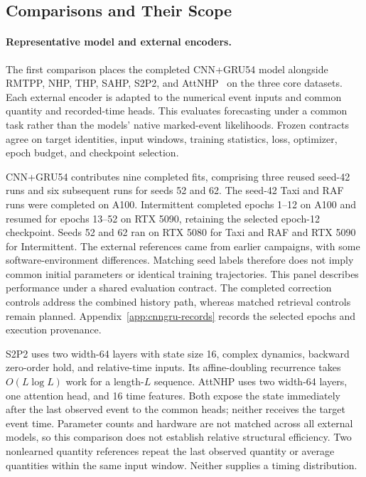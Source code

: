 \documentclass[runningheads]{llncs}
\begin{document}
\subsection{Comparisons and Their Scope}
\paragraph{Representative model and external encoders.}
The first comparison places the completed CNN+GRU54 model alongside RMTPP, NHP, THP, SAHP, S2P2, and AttNHP~\cite{du2016rmtpp,mei2017nhp,zuo2020thp,zhang2020sahp,chang2025s2p2,yang2022anhp} on the three core datasets. Each external encoder is adapted to the numerical event inputs and common quantity and recorded-time heads. This evaluates forecasting under a common task rather than the models' native marked-event likelihoods. Frozen contracts agree on target identities, input windows, training statistics, loss, optimizer, epoch budget, and checkpoint selection.

CNN+GRU54 contributes nine completed fits, comprising three reused seed-42 runs and six subsequent runs for seeds 52 and 62. The seed-42 Taxi and RAF runs were completed on A100. Intermittent completed epochs 1--12 on A100 and resumed for epochs 13--52 on RTX 5090, retaining the selected epoch-12 checkpoint. Seeds 52 and 62 ran on RTX 5080 for Taxi and RAF and RTX 5090 for Intermittent. The external references came from earlier campaigns, with some software-environment differences. Matching seed labels therefore does not imply common initial parameters or identical training trajectories. This panel describes performance under a shared evaluation contract. The completed correction controls address the combined history path, whereas matched retrieval controls remain planned. Appendix~\ref{app:cnngru-records} records the selected epochs and execution provenance.

S2P2 uses two width-64 layers with state size 16, complex dynamics, backward zero-order hold, and relative-time inputs. Its affine-doubling recurrence takes $O(L\log L)$ work for a length-$L$ sequence. AttNHP uses two width-64 layers, one attention head, and 16 time features. Both expose the state immediately after the last observed event to the common heads; neither receives the target event time. Parameter counts and hardware are not matched across all external models, so this comparison does not establish relative structural efficiency. Two nonlearned quantity references repeat the last observed quantity or average quantities within the same input window. Neither supplies a timing distribution.
\end{document}
